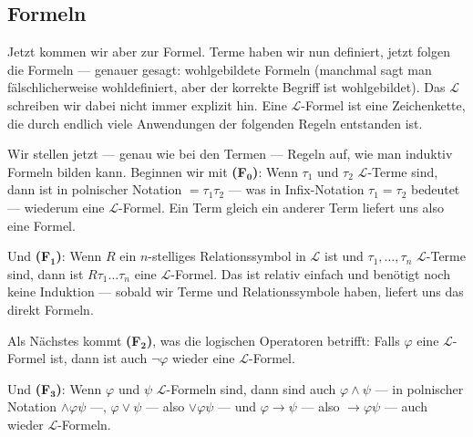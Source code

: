 \subsection{Formeln}

\begin{spoken-clean}[00:52:52 - 00:54:52]
Jetzt kommen wir aber zur Formel. Terme haben wir nun definiert, jetzt folgen die Formeln --- genauer gesagt: wohlgebildete Formeln (manchmal sagt man fälschlicherweise wohldefiniert, aber der korrekte Begriff ist wohlgebildet). Das $\mathcal{L}$ schreiben wir dabei nicht immer explizit hin. Eine $\mathcal{L}$-Formel ist eine Zeichenkette, die durch endlich viele Anwendungen der folgenden Regeln entstanden ist.

Wir stellen jetzt --- genau wie bei den Termen --- Regeln auf, wie man induktiv Formeln bilden kann. Beginnen wir mit \textbf{(F$_{\mathbf{0}}$)}: Wenn $\tau_1$ und $\tau_2$ $\mathcal{L}$-Terme sind, dann ist in polnischer Notation $=\tau_1\tau_2$ --- was in Infix-Notation $\tau_1 = \tau_2$ bedeutet --- wiederum eine $\mathcal{L}$-Formel. Ein Term gleich ein anderer Term liefert uns also eine Formel.
\end{spoken-clean}


\begin{spoken-clean}[00:54:52 - 00:56:37]
Und \textbf{(F$_{\mathbf{1}}$)}: Wenn $R$ ein $n$-stelliges Relationssymbol in $\mathcal{L}$ ist und $\tau_1, \dots, \tau_n$ $\mathcal{L}$-Terme sind, dann ist $R\tau_1\dots\tau_n$ eine $\mathcal{L}$-Formel. Das ist relativ einfach und benötigt noch keine Induktion --- sobald wir Terme und Relationssymbole haben, liefert uns das direkt Formeln.

Als Nächstes kommt \textbf{(F$_{\mathbf{2}}$)}, was die logischen Operatoren betrifft: Falls $\varphi$ eine $\mathcal{L}$-Formel ist, dann ist auch $\neg\varphi$ wieder eine $\mathcal{L}$-Formel.
\end{spoken-clean}

\begin{spoken-clean}[00:56:37 - 00:58:22]
Und \textbf{(F$_{\mathbf{3}}$)}: Wenn $\varphi$ und $\psi$ $\mathcal{L}$-Formeln sind, dann sind auch $\varphi \wedge \psi$ --- in polnischer Notation $\wedge\varphi\psi$ ---, $\varphi\vee \psi$ --- also $\vee\varphi\psi$ --- und $\varphi \rightarrow \psi$ --- also $\rightarrow\varphi\psi$ --- auch wieder $\mathcal{L}$-Formeln.
\end{spoken-clean}

